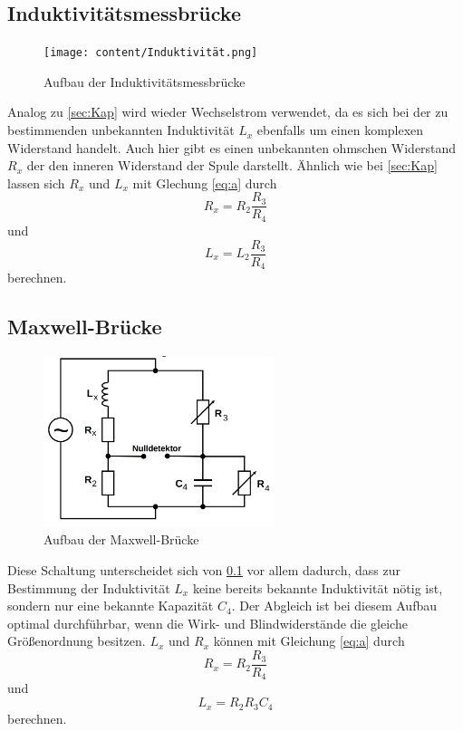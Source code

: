 \subsection{Induktivitätsmessbrücke}
\label{sec:Ind}
\begin{figure}[H]
\centering
    \texttt{[image: content/Induktivität.png]}
    \caption{Aufbau der Induktivitätsmessbrücke\cite[221]{sample}}
\end{figure}
Analog zu \ref{sec:Kap} wird wieder Wechselstrom
verwendet, da es sich bei der zu bestimmenden
unbekannten Induktivität $L_x$ ebenfalls um einen
komplexen Widerstand handelt. Auch hier gibt es einen
unbekannten ohmschen Widerstand $R_x$ der den
inneren Widerstand der Spule darstellt. Ähnlich wie
bei \ref{sec:Kap} lassen sich $R_x$ und $L_x$ mit
Glechung \ref{eq:a} durch
\begin{equation}
    R_x=R_2\frac{R_3}{R_4}
    \label{eq:6}
\end{equation}
\noindent und
\begin{equation}
    L_x=L_2\frac{R_3}{R_4}
    \label{eq:7}
\end{equation}
\noindent berechnen.



\subsection{Maxwell-Brücke}
\begin{figure}[H]
\centering
    \includegraphics[height= 5cm]{content/Maxwell.png}
    \caption{Aufbau der Maxwell-Brücke\cite[222]{sample}}
\end{figure}

\noindent Diese Schaltung unterscheidet sich von
\ref{sec:Ind} vor allem dadurch, dass zur Bestimmung
der Induktivität $L_x$ keine bereits bekannte
Induktivität nötig ist, sondern nur eine
bekannte Kapazität $C_4$. Der Abgleich ist bei
diesem Aufbau optimal durchführbar, wenn
die Wirk- und Blindwiderstände die gleiche
Größenordnung besitzen. $L_x$ und $R_x$ können 
mit Gleichung \ref{eq:a} durch
\begin{equation}
    R_x=R_2\frac{R_3}{R_4}
    \label{eq:12}
\end{equation}
\noindent und
\begin{equation}
    L_x=R_2R_3C_4
    \label{eq:13}
\end{equation}
\noindent berechnen.




